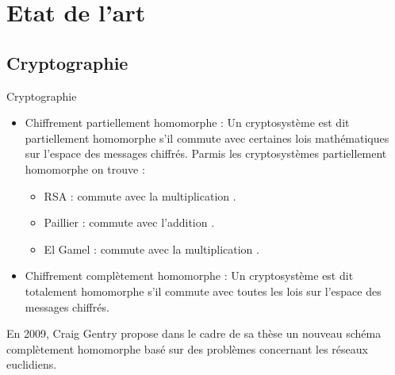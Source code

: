 \documentclass{beamer}
\begin{document}
\section{Etat de l'art}
  \subsection{Cryptographie}
  \begin{frame}{Cryptographie}
    \begin{itemize}
    \item{Chiffrement partiellement homomorphe :\newline
       Un cryptosystème est dit partiellement homomorphe s’il commute avec certaines lois mathématiques sur l’espace des messages chiffrés.
       Parmis les cryptosystèmes partiellement homomorphe on trouve :\newline
       \begin{itemize}
       \item{RSA : commute avec la multiplication .}
       \item{Paillier : commute avec l'addition .}
       \item{El Gamel : commute avec la multiplication .}
   \end{itemize}
      }
      \item{Chiffrement complètement homomorphe :\newline
      Un cryptosystème est dit totalement homomorphe s’il commute avec toutes les lois sur l’espace des messages chiffrés.
      }
  \end{itemize}
      En 2009, Craig Gentry propose dans le cadre de sa thèse un nouveau schéma complètement homomorphe basé sur des problèmes concernant les réseaux euclidiens.

\end{frame}
\end{document}

